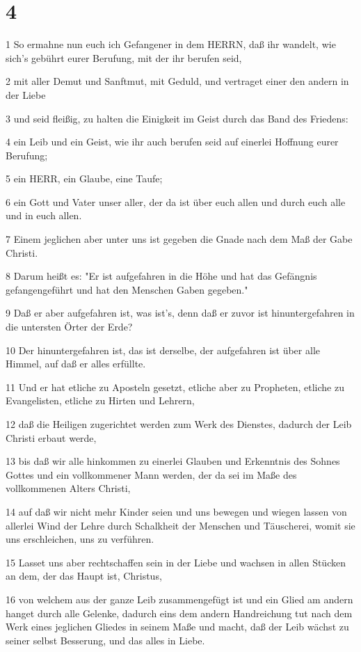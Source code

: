 \chapter{4}

\par 1 So ermahne nun euch ich Gefangener in dem HERRN, daß ihr wandelt, wie sich's gebührt eurer Berufung, mit der ihr berufen seid,
\par 2 mit aller Demut und Sanftmut, mit Geduld, und vertraget einer den andern in der Liebe
\par 3 und seid fleißig, zu halten die Einigkeit im Geist durch das Band des Friedens:
\par 4 ein Leib und ein Geist, wie ihr auch berufen seid auf einerlei Hoffnung eurer Berufung;
\par 5 ein HERR, ein Glaube, eine Taufe;
\par 6 ein Gott und Vater unser aller, der da ist über euch allen und durch euch alle und in euch allen.
\par 7 Einem jeglichen aber unter uns ist gegeben die Gnade nach dem Maß der Gabe Christi.
\par 8 Darum heißt es: "Er ist aufgefahren in die Höhe und hat das Gefängnis gefangengeführt und hat den Menschen Gaben gegeben."
\par 9 Daß er aber aufgefahren ist, was ist's, denn daß er zuvor ist hinuntergefahren in die untersten Örter der Erde?
\par 10 Der hinuntergefahren ist, das ist derselbe, der aufgefahren ist über alle Himmel, auf daß er alles erfüllte.
\par 11 Und er hat etliche zu Aposteln gesetzt, etliche aber zu Propheten, etliche zu Evangelisten, etliche zu Hirten und Lehrern,
\par 12 daß die Heiligen zugerichtet werden zum Werk des Dienstes, dadurch der Leib Christi erbaut werde,
\par 13 bis daß wir alle hinkommen zu einerlei Glauben und Erkenntnis des Sohnes Gottes und ein vollkommener Mann werden, der da sei im Maße des vollkommenen Alters Christi,
\par 14 auf daß wir nicht mehr Kinder seien und uns bewegen und wiegen lassen von allerlei Wind der Lehre durch Schalkheit der Menschen und Täuscherei, womit sie uns erschleichen, uns zu verführen.
\par 15 Lasset uns aber rechtschaffen sein in der Liebe und wachsen in allen Stücken an dem, der das Haupt ist, Christus,
\par 16 von welchem aus der ganze Leib zusammengefügt ist und ein Glied am andern hanget durch alle Gelenke, dadurch eins dem andern Handreichung tut nach dem Werk eines jeglichen Gliedes in seinem Maße und macht, daß der Leib wächst zu seiner selbst Besserung, und das alles in Liebe.
